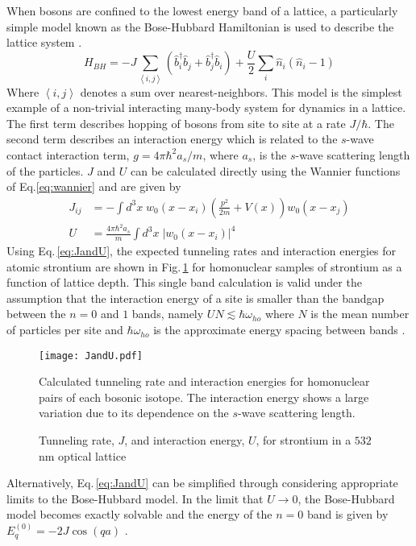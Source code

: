 When bosons are confined to the lowest energy band of a lattice, a particularly simple model known as the Bose-Hubbard Hamiltonian is used to describe the lattice system \cite{jbc98}. 
	\begin{equation} \label{eq:boseHubbard}
		 H_{BH} = -J \sum_{\left< i,j \right>} \left(\hat{b}^{\dagger}_i \hat{b}_j + \hat{b}^{\dagger}_j \hat{b}_i \right)
		 		  + \frac{U}{2} \sum_i \hat{n}_i(\hat{n}_i - 1)
	\end{equation}
Where $\left< i,j \right>$ denotes a sum over nearest-neighbors. This model is the simplest example of a non-trivial interacting many-body system for dynamics in a lattice.
The first term describes hopping of bosons from site to site at a rate $J/ \hbar$. 
The second term describes an interaction energy which is related to the $s$-wave contact interaction term, $g = 4 \pi \hbar^2 a_s/m$, where $a_s$, is the $s$-wave scattering length of the particles. 
$J$ and $U$ can be calculated directly using the Wannier functions of Eq.\;\ref{eq:wannier} and are given by \cite{Jaksch2005}
	\begin{equation} \label{eq:JandU}
	\begin{aligned}
		 J_{ij} &= - \int d^3x \; w_0(x-x_i) \left( \frac{p^2}{2m}+V(x) \right) w_0(x-x_j)\\
		 U &= \frac{4 \pi \hbar^2 a_s}{m} \int d^3x \; \left| w_0(x-x_i)\right|^4
	\end{aligned}
	\end{equation}
Using Eq.\,\ref{eq:JandU}, the expected tunneling rates and interaction energies for atomic strontium are shown in Fig.\,\ref{fig:fig_JandU} for homonuclear samples of strontium as a function of lattice depth. 
This single band calculation is valid under the assumption that the interaction energy of a site is smaller than the bandgap between the $n= 0$ and $1$ bands, namely $U N \lesssim \hbar \omega_{ho}$ where $N$ is the mean number of particles per site and $\hbar \omega_{ho}$ is the approximate energy spacing between bands \cite{Rey2004}. 
	\begin{figure}
		\centerline{
		\texttt{[image: JandU.pdf]}}
		\caption{Tunneling rate, $J$, and interaction energy, $U$, for strontium in a $532$\,nm optical lattice}{Calculated tunneling rate and interaction energies for homonuclear pairs of each bosonic isotope. The interaction energy shows a large variation due to its dependence on the $s$-wave scattering length.}
		\label{fig:fig_JandU}
	\end{figure}
Alternatively, Eq.\,\ref{eq:JandU} can be simplified through considering appropriate limits to the Bose-Hubbard model. In the limit that $U\!\rightarrow\!0$, the Bose-Hubbard model becomes exactly solvable and the energy of the $n=0$ band is given by $E_q^{(0)}=-2J \cos(q a)$ \cite{Jaksch2005}.
